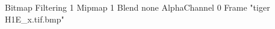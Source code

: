 {Bitmap
	{Filtering 1}
	{Mipmap 1}
	{Blend none}
	{AlphaChannel 0}
	{Frame "tiger H1E_x.tif.bmp"}
}
